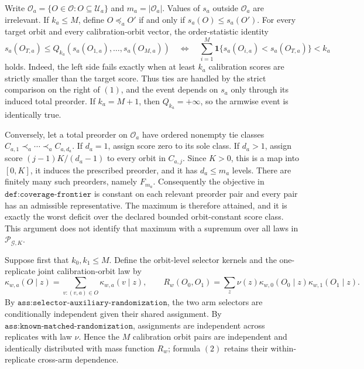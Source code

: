 Write \(\mathcal O_a=\{O\in\mathcal O:O\subseteq\mathcal U_a\}\) and \(m_a=|\mathcal O_a|\). Values of \(s_a\) outside \(\mathcal O_a\) are irrelevant. If \(k_a\le M\), define \(O\preceq_a O'\) if and only if \(s_a(O)\le s_a(O')\). For every target orbit and every calibration-orbit vector, the order-statistic identity
\[
s_a(O_{T,a})\le Q_{k_a}(s_a(O_{1,a}),\ldots,s_a(O_{M,a}))
\quad\Longleftrightarrow\quad
\sum_{i=1}^M\mathbf 1\{s_a(O_{i,a})<s_a(O_{T,a})\}<k_a
\tag{1}
\]
holds. Indeed, the left side fails exactly when at least \(k_a\) calibration scores are strictly smaller than the target score. Thus ties are handled by the strict comparison on the right of \((1)\), and the event depends on \(s_a\) only through its induced total preorder. If \(k_a=M+1\), then \(Q_{k_a}=+\infty\), so the armwise event is identically true.

Conversely, let a total preorder on \(\mathcal O_a\) have ordered nonempty tie classes \(C_{a,1}\prec_a\cdots\prec_a C_{a,d_a}\). If \(d_a=1\), assign score zero to its sole class. If \(d_a>1\), assign score \((j-1)K/(d_a-1)\) to every orbit in \(C_{a,j}\). Since \(K>0\), this is a map into \([0,K]\), it induces the prescribed preorder, and it has \(d_a\le m_a\) levels. There are finitely many such preorders, namely \(F_{m_a}\). Consequently the objective in \(\texttt{def:coverage-frontier}\) is constant on each relevant preorder pair and every pair has an admissible representative. The maximum is therefore attained, and it is exactly the worst deficit over the declared bounded orbit-constant score class. This argument does not identify that maximum with a supremum over all laws in \(\mathcal P_{\mathcal G,K}\).

Suppose first that \(k_0,k_1\le M\). Define the orbit-level selector kernels and the one-replicate joint calibration-orbit law by
\[
\kappa_{w,a}(O\mid z)=\sum_{v:(v,a)\in O}\kappa_{w,a}(v\mid z),
\qquad
R_w(O_0,O_1)=\sum_z\nu(z)\kappa_{w,0}(O_0\mid z)\kappa_{w,1}(O_1\mid z).
\tag{2}
\]
By \(\texttt{ass:selector-auxiliary-randomization}\), the two arm selectors are conditionally independent given their shared assignment. By \(\texttt{ass:known-matched-randomization}\), assignments are independent across replicates with law \(\nu\). Hence the \(M\) calibration orbit pairs are independent and identically distributed with mass function \(R_w\); formula \((2)\) retains their within-replicate cross-arm dependence.

